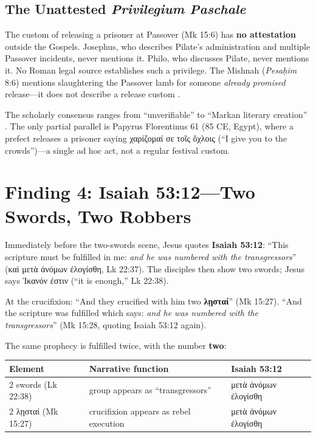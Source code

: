 \documentclass[12pt,a4paper]{article}
\begin{document}
\subsection{The Unattested \textit{Privilegium Paschale}}

The custom of releasing a prisoner at Passover (Mk 15:6) has \textbf{no attestation} outside the Gospels. Josephus, who describes Pilate's administration and multiple Passover incidents, never mentions it. Philo, who discusses Pilate, never mentions it. No Roman legal source establishes such a privilege. The Mishnah (\textit{Pesaḥim} 8:6) mentions slaughtering the Passover lamb for someone \textit{already promised} release---it does not describe a release custom \parencite{chavel1941}.

The scholarly consensus ranges from ``unverifiable'' \parencite{brown1994} to ``Markan literary creation'' \parencite{merritt1985, bond1998, crossan1995}. The only partial parallel is Papyrus Florentinus 61 (85 CE, Egypt), where a prefect releases a prisoner saying χαρίζομαί σε τοῖς ὄχλοις (``I give you to the crowds'')---a single ad hoc act, not a regular festival custom.

\section{Finding 4: Isaiah 53:12---Two Swords, Two Robbers}
\label{sec:isaiah}

Immediately before the two-swords scene, Jesus quotes \textbf{Isaiah 53:12}: ``This scripture must be fulfilled in me: \textit{and he was numbered with the transgressors}'' (καὶ μετὰ ἀνόμων ἐλογίσθη, Lk 22:37). The disciples then show two swords; Jesus says Ἱκανόν ἐστιν (``it is enough,'' Lk 22:38).

At the crucifixion: ``And they crucified with him two \textbf{λῃσταί}'' (Mk 15:27). ``And the scripture was fulfilled which says: \textit{and he was numbered with the transgressors}'' (Mk 15:28, quoting Isaiah 53:12 again).

The same prophecy is fulfilled twice, with the number \textbf{two}:

\begin{center}
\begin{tabular}{lll}
\toprule
\textbf{Element} & \textbf{Narrative function} & \textbf{Isaiah 53:12} \\
\midrule
2 swords (Lk 22:38) & group appears as ``transgressors'' & μετὰ ἀνόμων ἐλογίσθη \\
2 λῃσταί (Mk 15:27) & crucifixion appears as rebel execution & μετὰ ἀνόμων ἐλογίσθη \\
\bottomrule
\end{tabular}
\end{center}
\end{document}
